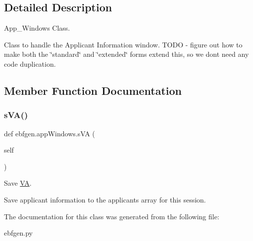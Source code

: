 \subsection{Detailed Description}
App\+\_\+\+Windows Class. 

Class to handle the Applicant Information window. T\+O\+DO -\/ figure out how to make both the \char`\"{}standard\char`\"{} and \char`\"{}extended\char`\"{} forms extend this, so we don\textquotesingle{}t need any code duplication. 

\subsection{Member Function Documentation}
\mbox{\label{classebfgen_1_1appWindows_ade756391968e89e24255b286f30d0bd8}} 
\subsubsection{\texorpdfstring{s\+V\+A()}{sVA()}}
{\footnotesize\ttfamily def ebfgen.\+app\+Windows.\+s\+VA (\begin{DoxyParamCaption}\item[{}]{self }\end{DoxyParamCaption})}



Save \hyperlink{classebfgen_1_1VA}{VA}. 

Save applicant information to the applicants array for this session. 

The documentation for this class was generated from the following file\+:\begin{DoxyCompactItemize}
\item 
ebfgen.\+py\end{DoxyCompactItemize}
